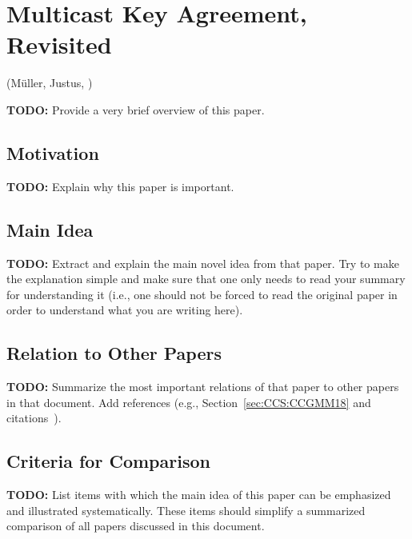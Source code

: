 \section{Multicast Key Agreement, Revisited}
\label{sec:RSA:BieDodTan22}
(Müller, Justus, \cite{RSA:BieDodTan22,EPRINT:BieDodTan21})

\alert{\textbf{TODO:} Provide a very brief overview of this paper.}

\subsection{Motivation}
\alert{\textbf{TODO:} Explain why this paper is important.}

\subsection{Main Idea}
\alert{\textbf{TODO:} Extract and explain the main novel idea from that paper. Try to make the explanation simple and make sure that one only needs to read your summary for understanding it (i.e., one should not be forced to read the original paper in order to understand what you are writing here).}

\subsection{Relation to Other Papers}
\alert{\textbf{TODO:} Summarize the most important relations of that paper to other papers in that document. Add references (e.g., Section~\ref{sec:CCS:CCGMM18} and citations~\cite{CCS:CCGMM18}).}

\subsection{Criteria for Comparison}
\alert{\textbf{TODO:} List items with which the main idea of this paper can be emphasized and illustrated systematically. These items should simplify a summarized comparison of all papers discussed in this document.}